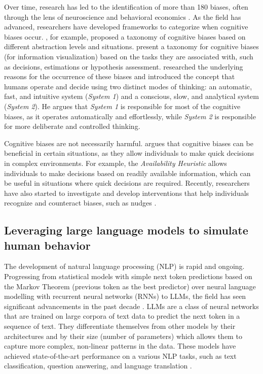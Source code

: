 \par Over time, research has led to the identification of more than 180 biases, often through the lens of neuroscience and behavioral economics \parencite{azzopardi2021cognitive}. As the field has advanced, researchers have developed frameworks to categorize when cognitive biases occur. \textcite{arnott1998taxonomy}, for example, proposed a taxonomy of cognitive biases based on different abstraction levels and situations. \textcite{dimara2018task} present a taxonomy for cognitive biases (for information visualization) based on the tasks they are associated with, such as decisions, estimations or hypothesis assessment. \textcite{kahneman2017thinking} researched the underlying reasons for the occurrence of these biases and introduced the concept that humans operate and decide using two distinct modes of thinking: an automatic, fast, and intuitive system (\textit{System 1}) and a conscious, slow, and analytical system (\textit{System 2}). He argues that \textit{System 1} is responsible for most of the cognitive biases, as it operates automatically and effortlessly, while \textit{System 2} is responsible for more deliberate and controlled thinking.

\par Cognitive biases are not necessarily harmful. \textcite{gigerenzer2007gut} argues that cognitive biases can be beneficial in certain situations, as they allow individuals to make quick decisions in complex environments. For example, the \textit{Availability Heuristic} allows individuals to make decisions based on readily available information, which can be useful in situations where quick decisions are required. Recently, researchers have also started to investigate and develop interventions that help individuals recognize and counteract biases, such as nudges \parencite{thaler2008nudge}.


\subsection{Leveraging large language models to simulate human behavior}
\par The development of natural language processing (NLP) is rapid and ongoing. Progressing from statistical models with simple next token predictions based on the Markov Theorem (previous token as the best predictor) over neural language modelling with recurrent neural networks (RNNs) to LLMs, the field has seen significant advancements in the past decade \parencite{zhao2023survey}. LLMs are a class of neural networks that are trained on large corpora of text data to predict the next token in a sequence of text. They differentiate themselves from other models by their architectures and by their size (number of parameters) which allows them to capture more complex, non-linear patterns in the data. These models have achieved state-of-the-art performance on a various NLP tasks, such as text classification, question answering, and language translation \parencite{naveed2023comprehensive, zhao2023survey}.

